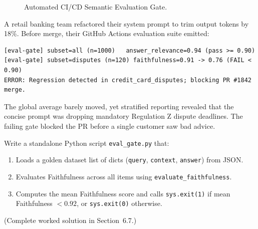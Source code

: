 \begin{figure}[htbp]
\centering
{}
\caption{Automated CI/CD Semantic Evaluation Gate.}
\label{fig:v2-ch06-cicd}
\end{figure}

\begin{realworldbox}
A retail banking team refactored their system prompt to trim output tokens by 18\%. Before merge, their GitHub Actions evaluation suite emitted:
\begin{lstlisting}[basicstyle=\ttfamily\scriptsize]
[eval-gate] subset=all (n=1000)   answer_relevance=0.94 (pass >= 0.90)
[eval-gate] subset=disputes (n=120) faithfulness=0.91 -> 0.76 (FAIL < 0.90)
ERROR: Regression detected in credit_card_disputes; blocking PR #1842 merge.
\end{lstlisting}
The global average barely moved, yet stratified reporting revealed that the concise prompt was dropping mandatory Regulation Z dispute deadlines. The failing gate blocked the PR before a single customer saw bad advice.
\end{realworldbox}

\begin{tryityourselfbox}
Write a standalone Python script \texttt{eval\_gate.py} that:
\begin{enumerate}
  \item Loads a golden dataset list of dicts (\texttt{query}, \texttt{context}, \texttt{answer}) from JSON.
  \item Evaluates Faithfulness across all items using \texttt{evaluate\_faithfulness}.
  \item Computes the mean Faithfulness score and calls \texttt{sys.exit(1)} if mean Faithfulness $< 0.92$, or \texttt{sys.exit(0)} otherwise.
\end{enumerate}
(Complete worked solution in Section~6.7.)
\end{tryityourselfbox}

